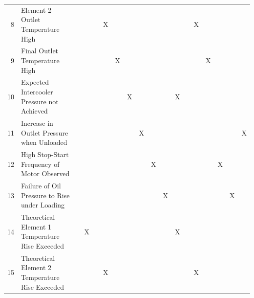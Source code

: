 \begin{table}[htbp]
\begin{tabular}{r|l|r|r|r|r|r|r|r|r|r|r|r|r|r|r|r|r}
    8     & Element 2 Outlet Temperature High &       &       &       & X     &       &       &       &       &       &       &       & X     &       &       &       &  \\
    9     & Final Outlet Temperature High &       &       &       &       & X     &       &       &       &       &       &       &       & X     &       &       &  \\
    10    & Expected Intercooler Pressure not Achieved &       &       &       &       &       & X     &       &       &       & X     &       &       &       &       &       &  \\
    11    & Increase in Outlet Pressure when Unloaded &       &       &       &       &       &       & X     &       &       &       &       &       &       &       &       & X \\
    12    & High Stop-Start Frequency of Motor Observed &       &       &       &       &       &       &       & X     &       &       &       &       &       & X     &       &  \\
    13    & Failure of Oil Pressure to Rise under Loading &       &       &       &       &       &       &       &       & X     &       &       &       &       &       & X     &  \\
    14    & Theoretical Element 1 Temperature Rise Exceeded &       & X     &       &       &       &       &       &       &       & X     &       &       &       &       &       &  \\
    15    & Theoretical Element 2 Temperature Rise Exceeded &       &       &       & X     &       &       &       &       &       &       &       & X     &       &       &       &  \\
    \bottomrule
    \end{tabular}%
  \label{tab:ruleset}%
\end{table}%


